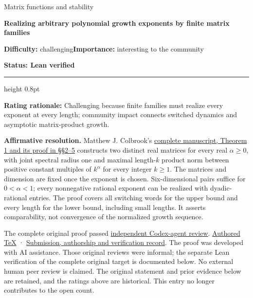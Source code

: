\documentclass[11pt,a4paper]{article}
\makeatletter
\renewcommand{\subsection}{\Needspace{4\baselineskip}\@startsection{subsection}{2}{0pt}{9pt plus 1pt minus 1pt}{3pt}{\sffamily\bfseries\normalsize\color{ink}}}
\makeatother
\begin{document}
{\sffamily\small\color{muted}Matrix functions and stability\par}
\vspace{3pt}
{\raggedright{}\sffamily\bfseries\fontsize{21}{24}\selectfont\color{ink}Realizing
arbitrary polynomial growth exponents by finite matrix families\par}
\vspace{7pt}
{\sffamily\small\textbf{Difficulty:} challenging\quad\textbf{Importance:} interesting
to the community\par}
{\sffamily\small\bfseries\color{accent}Status: Lean verified\par}
\vspace{4pt}
{\color{accent}\hrule height 0.8pt}
\vspace{6pt}
\textbf{Rating rationale:} Challenging because finite families must
realize every exponent at every length; community impact connects
switched dynamics and asymptotic matrix-product growth.

\subsection{Resolution --- 2026-09-11}\label{resolution-2026-09-11}

\textbf{Affirmative resolution.} Matthew J. Colbrook's
\href{https://github.com/ajt60gaibb/OpenProblemsInNLA/blob/main/references/colbrook-jsr-growth-2026-09-11/manuscripts/arbitrary_growth_exponents.pdf}{complete
manuscript, Theorem 1 and its proof in §§2--5} constructs two distinct
real matrices for every real \(\alpha\ge0\), with joint spectral radius
one and maximal length-\(k\) product norm between positive constant
multiples of \(k^\alpha\) for every integer \(k\ge1\). The matrices and
dimension are fixed once the exponent is chosen. Six-dimensional pairs
suffice for \(0<\alpha<1\); every nonnegative rational exponent can be
realized with dyadic-rational entries. The proof covers all switching
words for the upper bound and every length for the lower bound,
including small lengths. It asserts comparability, not convergence of
the normalized growth sequence.

The complete original proof passed
\href{https://github.com/ajt60gaibb/OpenProblemsInNLA/blob/main/references/colbrook-jsr-growth-2026-09-11/verification/reviews/MF-12-review.md}{independent
Codex-agent review}.
\href{https://github.com/ajt60gaibb/OpenProblemsInNLA/blob/main/references/colbrook-jsr-growth-2026-09-11/manuscripts/arbitrary_growth_exponents.tex}{Authored
TeX} ·
\href{https://github.com/ajt60gaibb/OpenProblemsInNLA/blob/main/references/colbrook-jsr-growth-2026-09-11/README.md}{Submission,
authorship and verification record}. The proof was developed with AI
assistance. Those original reviews were informal; the separate Lean
verification of the complete original target is documented below. No
external human peer review is claimed. The original statement and prior
evidence below are retained, and the ratings above are historical. This
entry no longer contributes to the open count.
\end{document}
